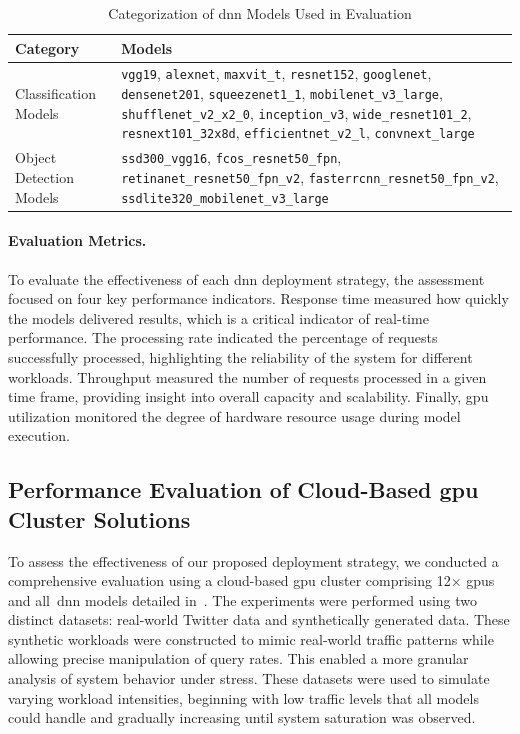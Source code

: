 \begin{table}[h]
	\centering \caption{Categorization of \acrlong{dnn} Models Used in Evaluation} \label{tab:dnn-models}
	\begin{tabular}{p{4cm}p{6cm}}
		\hline
		\textbf{Category} & \textbf{Models}
		\\ \hline
		Classification Models &
		\texttt{vgg19},
		\texttt{alexnet},
		\texttt{maxvit\_t},
		\texttt{resnet152},
		\texttt{googlenet},
		\texttt{densenet201},
		\texttt{squeezenet1\_1},
		\texttt{mobilenet\_v3\_large},
		\texttt{shufflenet\_v2\_x2\_0},
		\texttt{inception\_v3},
		\texttt{wide\_resnet101\_2},
		\texttt{resnext101\_32x8d},
		\texttt{efficientnet\_v2\_l},
		\texttt{convnext\_large}
		\\ \hline
		Object Detection Models &
		\texttt{ssd300\_vgg16},
		\texttt{fcos\_resnet50\_fpn},
		\texttt{retinanet\_resnet50\_fpn\_v2},
		\texttt{fasterrcnn\_resnet50\_fpn\_v2},
		\texttt{ssdlite320\_mobilenet\_v3\_large}
		\\ \hline 
	\end{tabular}
\end{table}

\paragraph{Evaluation Metrics.} To evaluate the effectiveness of each \acrshort{dnn} deployment strategy, the assessment focused on four key performance indicators. Response time measured how quickly the models delivered results, which is a critical indicator of real-time performance. The processing rate indicated the percentage of requests successfully processed, highlighting the reliability of the system for different workloads. Throughput measured the number of requests processed in a given time frame, providing insight into overall capacity and scalability. Finally, \acrshort{gpu} utilization monitored the degree of hardware resource usage during model execution.


\subsection{Performance Evaluation of Cloud-Based \acrshort{gpu} Cluster Solutions}

To assess the effectiveness of our proposed deployment strategy, we conducted a comprehensive evaluation using a cloud-based \acrshort{gpu} cluster comprising 12$\times$ \acrshort{gpu}s and all~\acrshort{dnn} models detailed in~. The experiments were performed using two distinct datasets: real-world Twitter data and synthetically generated data. These synthetic workloads were constructed to mimic real-world traffic patterns while allowing precise manipulation of query rates. This enabled a more granular analysis of system behavior under stress. These datasets were used to simulate varying workload intensities, beginning with low traffic levels that all models could handle and gradually increasing until system saturation was observed.

